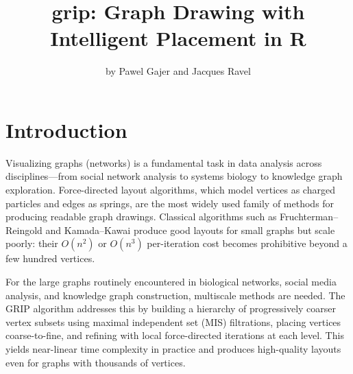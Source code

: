 \title{grip: Graph Drawing with Intelligent Placement in R}


\author{by Pawel Gajer and Jacques Ravel}

\maketitle


\section{Introduction}\label{introduction}

Visualizing graphs (networks) is a fundamental task in data analysis across
disciplines---from social network analysis to systems biology to knowledge graph
exploration. Force-directed layout algorithms, which model vertices as charged
particles and edges as springs, are the most widely used family of methods for
producing readable graph drawings. Classical algorithms such as
Fruchterman--Reingold \citep{fruchterman1991} and Kamada--Kawai \citep{kamada1989} produce
good layouts for small graphs but scale poorly: their \(O(n^2)\) or \(O(n^3)\)
per-iteration cost becomes prohibitive beyond a few hundred vertices.

For the large graphs routinely encountered in biological networks, social media
analysis, and knowledge graph construction, multiscale methods are needed. The
GRIP algorithm \citep{gajer2002, gajer2004} addresses this by building a hierarchy
of progressively coarser vertex subsets using maximal independent set (MIS)
filtrations, placing vertices coarse-to-fine, and refining with local
force-directed iterations at each level. This yields near-linear time complexity
in practice and produces high-quality layouts even for graphs with thousands of
vertices.


